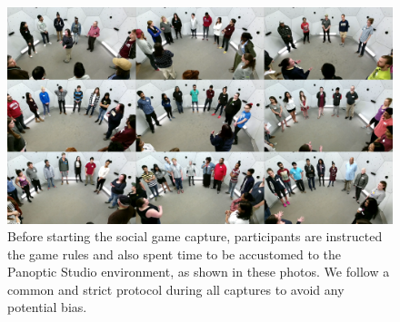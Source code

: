 
%


\begin{figure}
	\centering
	\includegraphics[trim=0 0 0 0,clip,width=\linewidth]{ssp_fig/haggling_intro}
	\caption{Before starting the social game capture, participants are instructed the game rules and also spent time to be accustomed to the Panoptic Studio environment, as shown in these photos. We follow a common and strict protocol during all captures to avoid any potential bias.} 
	\label{fig:haggling_intro}
\end{figure}

